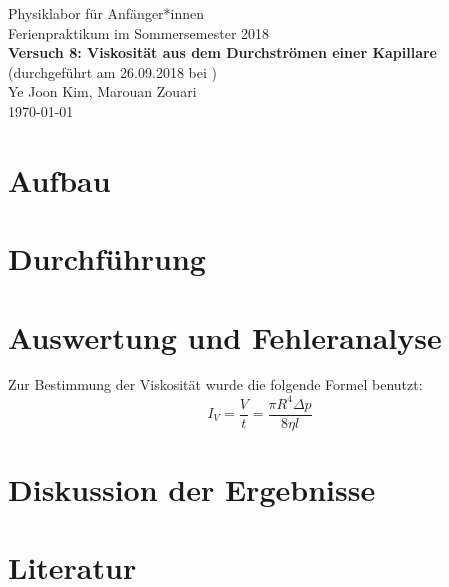 \documentclass[11pt,a4paper]{article}
\begin{document}
	

{
	\centering 
	\large 
	Physiklabor für Anfänger*innen \\
	Ferienpraktikum im Sommersemester 2018 \\[4mm]
	\textbf{\LARGE 
		Versuch 8: Viskosität aus dem Durchströmen einer Kapillare
	} \\[3mm]
	(durchgeführt am 26.09.2018 bei ) \\
	Ye Joon Kim, Marouan Zouari\\
	\today \\[10mm]
}
\tableofcontents

\section{Aufbau}


\section{Durchführung}

\section{Auswertung und Fehleranalyse}
Zur Bestimmung der Viskosität wurde die folgende Formel benutzt:
\begin{equation}
	I_V = \frac{V}{t} = \frac{\pi R^4 \Delta p}{8 \eta l}
\end{equation}

\section{Diskussion der Ergebnisse}

\section{Literatur}
	

	
	
	
	
	
	
	
	
	
	
	
	
	
	
	
\end{document}
